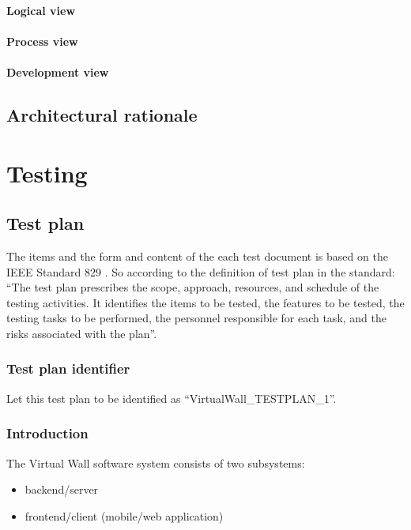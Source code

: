 \documentclass[11pt]{book}
\begin{document}
\subsubsection{Logical view}

\subsubsection{Process view}

\subsubsection{Development view}

\section{Architectural rationale}

\chapter{Testing}

\section{Test plan}

The items and the form and content of the each test document is based on the IEEE Standard 829 \cite{ieee829}. So according to the definition of test plan in the standard: ``The test plan prescribes the scope, approach, resources, and schedule of the testing activities. It identifies the items to be tested, the features to be tested, the testing tasks to be performed, the personnel responsible for each task, and the risks associated with the plan''.

\subsection{Test plan identifier}
Let this test plan to be identified as ``VirtualWall\_TESTPLAN\_1''.

\subsection{Introduction}
The Virtual Wall software system consists of two subsystems:

\begin{itemize}
	\item backend/server
	\item frontend/client (mobile/web application)
\end{itemize}
\end{document}
